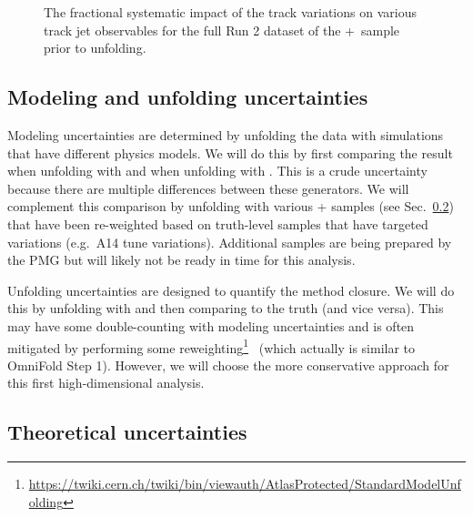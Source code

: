 \begin{figure}[h!]
  \caption{The fractional systematic impact of the track variations on various track jet observables for the full Run 2 dataset of the \powheg+\pythia~sample prior to unfolding.}
  \label{fig:PP8TrackJetSyst}
\end{figure}

\subsection{Modeling and unfolding uncertainties}

Modeling uncertainties are determined by unfolding the data with simulations that have different physics models.  We will do this by first comparing the result when unfolding with \pythia{} and when unfolding with \sherpa.  This is a crude uncertainty because there are multiple differences between these generators.  We will complement this comparison by unfolding with various \powheg+\pythia{} samples (see Sec.~\ref{sec:theoryuncerts}) that have been re-weighted based on truth-level samples that have targeted variations (e.g.\ A14 tune variations).  Additional samples are being prepared by the PMG but will likely not be ready in time for this analysis.

Unfolding uncertainties are designed to quantify the method closure.  We will do this by unfolding \pythia{} with \sherpa{} and then comparing to the \pythia{} truth (and vice versa).  This may have some double-counting with modeling uncertainties and is often mitigated by performing some reweighting\footnote{\url{https://twiki.cern.ch/twiki/bin/viewauth/AtlasProtected/StandardModelUnfolding}}~\cite{Malaescu:2009dm} (which actually is similar to OmniFold Step 1).  However, we will choose the more conservative approach for this first high-dimensional analysis.

\clearpage

\subsection{Theoretical uncertainties}
\label{sec:theoryuncerts}
